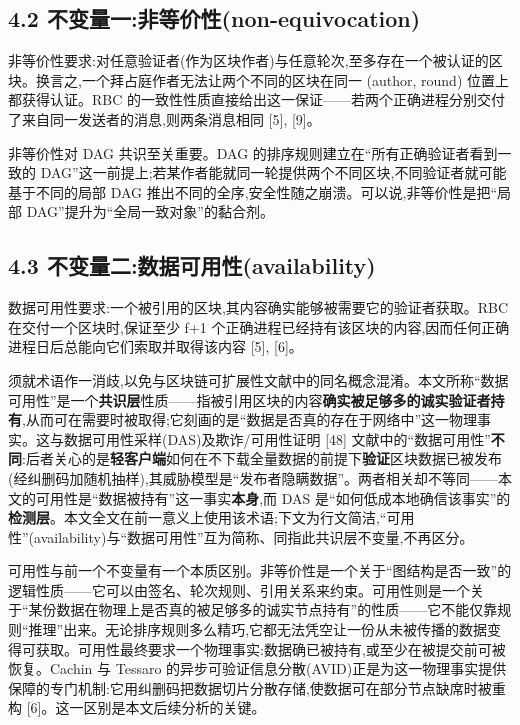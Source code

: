 \documentclass[UTF8,fontset=windows,a4paper,11pt]{ctexart}
\begin{document}
\subsection{4.2
不变量一:非等价性(non-equivocation)}\label{ux4e0dux53d8ux91cfux4e00ux975eux7b49ux4ef7ux6027non-equivocation}

非等价性要求:对任意验证者(作为区块作者)与任意轮次,至多存在一个被认证的区块。换言之,一个拜占庭作者无法让两个不同的区块在同一
(author, round) 位置上都获得认证。RBC
的一致性性质直接给出这一保证------若两个正确进程分别交付了来自同一发送者的消息,则两条消息相同
{[}5{]}, {[}9{]}。

非等价性对 DAG 共识至关重要。DAG
的排序规则建立在``所有正确验证者看到一致的
DAG''这一前提上;若某作者能就同一轮提供两个不同区块,不同验证者就可能基于不同的局部
DAG 推出不同的全序,安全性随之崩溃。可以说,非等价性是把``局部
DAG''提升为``全局一致对象''的黏合剂。

\subsection{4.3
不变量二:数据可用性(availability)}\label{ux4e0dux53d8ux91cfux4e8cux6570ux636eux53efux7528ux6027availability}

数据可用性要求:一个被引用的区块,其内容确实能够被需要它的验证者获取。RBC
在交付一个区块时,保证至少 f+1
个正确进程已经持有该区块的内容,因而任何正确进程日后总能向它们索取并取得该内容
{[}5{]}, {[}6{]}。

须就术语作一消歧,以免与区块链可扩展性文献中的同名概念混淆。本文所称``数据可用性''是一个\textbf{共识层}性质------指被引用区块的内容\textbf{确实被足够多的诚实验证者持有},从而可在需要时被取得;它刻画的是``数据是否真的存在于网络中''这一物理事实。这与数据可用性采样(DAS)及欺诈/可用性证明
{[}48{]} 文献中的``数据可用性''\textbf{不同}:后者关心的是\textbf{轻客户端}如何在不下载全量数据的前提下\textbf{验证}区块数据已被发布(经纠删码加随机抽样),其威胁模型是``发布者隐瞒数据''。两者相关却不等同------本文的可用性是``数据被持有''这一事实\textbf{本身},而
DAS 是``如何低成本地确信该事实''的\textbf{检测层}。本文全文在前一意义上使用该术语;下文为行文简洁,``可用性''(availability)与``数据可用性''互为简称、同指此共识层不变量,不再区分。

可用性与前一个不变量有一个本质区别。非等价性是一个关于``图结构是否一致''的逻辑性质------它可以由签名、轮次规则、引用关系来约束。可用性则是一个关于``某份数据在物理上是否真的被足够多的诚实节点持有''的性质------它不能仅靠规则``推理''出来。无论排序规则多么精巧,它都无法凭空让一份从未被传播的数据变得可获取。可用性最终要求一个物理事实:数据确已被持有,或至少在被提交前可被恢复。Cachin
与 Tessaro
的异步可验证信息分散(AVID)正是为这一物理事实提供保障的专门机制:它用纠删码把数据切片分散存储,使数据可在部分节点缺席时被重构
{[}6{]}。这一区别是本文后续分析的关键。
\end{document}
